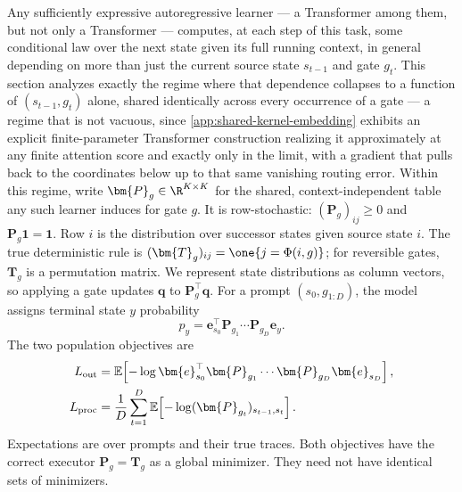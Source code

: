 Any sufficiently expressive autoregressive learner --- a Transformer among
them, but not only a Transformer --- computes, at each step of this task,
some conditional law over the next state given its full running context,
in general depending on more than just the current source state $s_{t-1}$
and gate $g_t$. This section analyzes exactly the regime where that
dependence collapses to a function of $(s_{t-1},g_t)$ alone, shared
identically across every occurrence of a gate --- a regime that is not
vacuous, since \cref{app:shared-kernel-embedding} exhibits an explicit
finite-parameter Transformer construction realizing it approximately at
any finite attention score and exactly only in the limit, with a gradient
that pulls back to the coordinates below up to that same vanishing
routing error. Within this regime, write $\bm{P}_g\in\R^{K\times K}$ for the
shared, context-independent table any such learner induces for gate $g$.
It is row-stochastic:
$(\bm{P}_g)_{ij}\ge0$ and $\bm{P}_g\mathbf1=\mathbf1$. Row $i$ is the distribution over
successor states given source state $i$. The true deterministic rule is
$(\bm{T}_g)_{ij}=\one\{j=\Phi(i,g)\}$; for reversible gates, $\bm{T}_g$ is a permutation
matrix. We represent state distributions as column vectors, so applying a gate
updates $\bm{q}$ to $\bm{P}_g^\top \bm{q}$. For a prompt $(s_0,g_{1:D})$, the model assigns
terminal state $y$ probability
\begin{equation}
 p_y=\bm{e}_{s_0}^{\top}\bm{P}_{g_1}\cdots \bm{P}_{g_D}\bm{e}_y .
 \label{eq:terminal-probability}
\end{equation}
The two population objectives are
\begin{align}
 L_{\rm out}
 &=\mathbb E\!\left[-\log
 \bm{e}_{s_0}^{\top}\bm{P}_{g_1}\cdots \bm{P}_{g_D}\bm{e}_{s_D}\right],
 \label{eq:shared-outcome-loss}\\
 L_{\rm proc}
 &=\frac1D\sum_{t=1}^{D}
   \mathbb E\!\left[-\log(\bm{P}_{g_t})_{s_{t-1},s_t}\right].
 \label{eq:shared-process-loss}
\end{align}
Expectations are over prompts and their true traces. Both objectives have the
correct executor $\bm{P}_g=\bm{T}_g$ as a global minimizer. They need not have identical
sets of minimizers.

